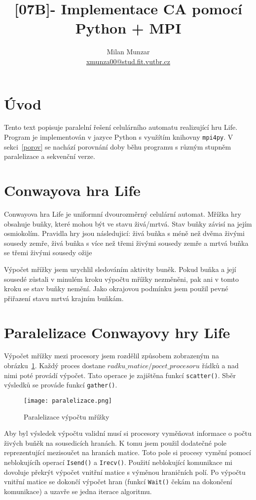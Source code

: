 \documentclass[12pt]{article}
\title{[07B]- Implementace CA pomocí Python + MPI}
\author{Milan Munzar \\
\normalsize{\href{mailto:xmunza00@stud.fit.vutbr.cz}{xmunza00@stud.fit.vutbr.cz}}}
\date{}
\begin{document}
\maketitle

\section{Úvod}
Tento text popisuje paralelní řešení celulárního automatu realizující hru Life. Program je implementován v jazyce Python s využítím knihovny \texttt{mpi4py}. V sekci~\ref{porov} se nachází porovnání doby běhu programu s různým stupněm paralelizace a sekvenční verze.

\section{Conwayova hra Life}
Conwayova hra Life je uniformní dvourozměrný celulární automat. Mřížka hry obsahuje buňky, které mohou být ve stavu živá/mrtvá. Stav buňky závisí na jejím osmiokolím. Pravidla hry jsou následujicí: živá buňka s méně než dvěma živými sousedy zemře, živá buňka s více než třemi živými sousedy zemře a mrtvá buňka se třemi živými sousedy ožije

Výpočet mřížky jsem urychlil sledováním aktivity buněk. Pokud buňka a její sousedé zůstali v minulém kroku výpočtu mřížky nezměněni, pak ani v tomto kroku se stav buňky nemění. Jako okrajovou podmínku jsem použil pevné přiřazení stavu mrtvá krajním buňkám.

\section{Paralelizace Conwayovy hry Life}
\label{implemLife}
Výpočet mřížky mezi procesory jsem rozdělil způsobem zobrazeným na obrázku~\ref{div}. Každý proces dostane $radku\_matice/pocet\_procesoru$ řádků a nad nimi poté provádí výpočet. Tato operace je zajištěna funkcí \texttt{scatter()}. Sběr výsledků se prováde funkcí \texttt{gather()}.

\begin{figure}
    \centering
    \texttt{[image: paralelizace.png]}
    \caption{Paralelizace výpočtu mřížky}
    \label{div}
\end{figure}

Aby byl výsledek výpočtu validní musí si procesory vyměňovat informace o počtu živých buňěk na sousedicích hranách. K tomu jsem použil dodatečné pole reprezentující mezisoučet na hranách matice. Toto pole si procesy vymění pomocí neblokujícíh operací \texttt{Isend()} a \texttt{Irecv()}. Použití neblokující komunikace mi dovoluje překrýt výpočet vnitřní matice s výměnou hraničních polí.
Po výpočtu vnitřní matice se dokončí výpočet hran (funkcí \texttt{Wait()} čekám na dokončení komunikace) a uzavře se jedna iterace algoritmu.
\end{document}
